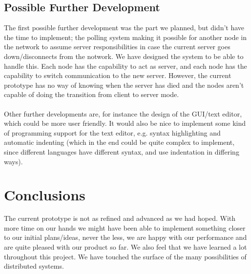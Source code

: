 \documentclass[12pt]{article}
\begin{document}
\subsection{Possible Further Development} %
\label{sub:possible_further_development}
The first possible further development was the part we planned, but didn't have the time to implement; the polling system making it possible for another node in the network to assume server responsibilities in case the current server goes down/disconnects from the notwork. We have designed the system to be able to handle this. Each node has the capability to act as server, and each node has the capability to switch communication to the new server. However, the current prototype has no way of knowing when the server has died and the nodes aren't capable of doing the transition from client to server mode. 
\\\\
Other further developments are, for instance the design of the GUI/text editor, which could be more user friendly. It would also be nice to implement some kind of programming support for the text editor, e.g. syntax highlighting and automatic indenting (which in the end could be quite complex to implement, since different languages have different syntax, and use indentation in differing ways).


\section{Conclusions} %
\label{sec:conclusions}
The current prototype is not as refined and advanced as we had hoped. With more time on our hands we might have been able to implement something closer to our initial plans/ideas, never the less, we are happy with our performance and are quite pleased with our product so far. We also feel that we have learned a lot throughout this project. We have touched the surface of the many possibilities of distributed systems.

\end{document}
